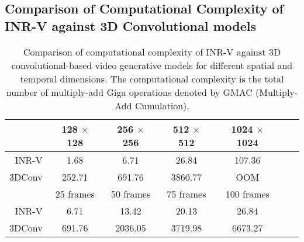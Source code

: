 \documentclass[10pt]{article} \usepackage[accepted]{tmlr}
\begin{document}
\subsection{Comparison of Computational Complexity of INR-V against 3D Convolutional models}


\begin{wraptable}[]{R}{9.5cm}
\vspace{-5pt}
\centering
\begin{adjustbox}{max width=\linewidth}
\begin{tabular}{r|cccccc}
\toprule  
& 128 $\times$ 128 & 256 $\times$ 256 & 512 $\times$ 512 & 1024 $\times$ 1024 
\\ \midrule
INR-V & 1.68 & 6.71 & 26.84 & 107.36 \\
3DConv & 252.71 & 691.76 & 3860.77 & OOM \\
\toprule
& 25 frames & 50 frames & 75 frames & 100 frames \\
\midrule
INR-V & 6.71 & 13.42 & 20.13 & 26.84 &  \\
3DConv & 691.76 & 2036.05 & 3719.98 & 6673.27 \\
\bottomrule
\end{tabular}
\end{adjustbox}
\caption{Comparison of computational complexity of INR-V against 3D convolutional-based video generative models for different spatial and temporal dimensions. The computational complexity is the total number of multiply-add Giga operations denoted by GMAC (Multiply-Add Cumulation).}
\label{tab:computation_complexity}

\end{wraptable}
\end{document}
